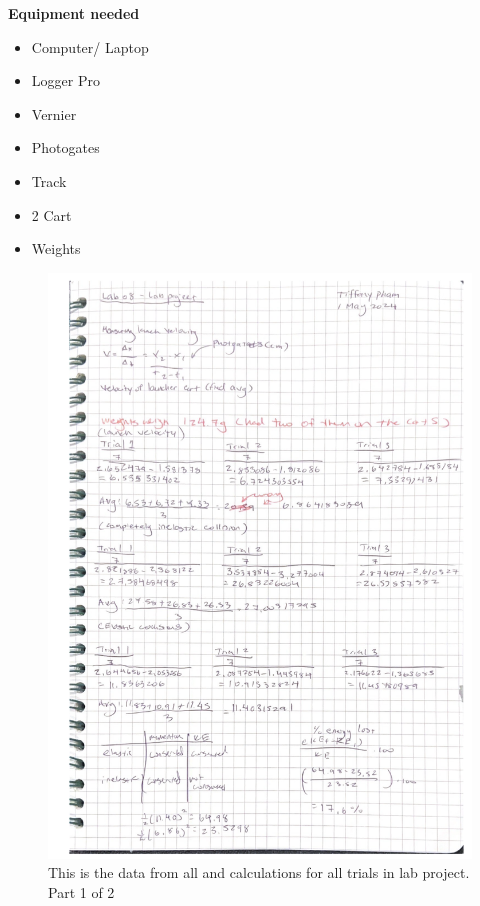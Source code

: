 \documentclass[idxtotoc,hyperref,openany]{labbook} %
\begin{document}
\hfill \break
\textbf{Equipment needed}
\begin{itemize}
    \item Computer/ Laptop
    \item Logger Pro
    \item Vernier
    \item Photogates
    \item Track
    \item 2 Cart
    \item Weights
\end{itemize}


\newpage
{}
\begin{figure}[H] %
\begin{center}
\includegraphics[width=0.8\linewidth]{images/Lab.08/Lab08Calc1.png}
\end{center}
\caption{This is the data from all and calculations for all trials in lab project. Part 1 of 2}
\label{fig:Lab08Calc1}
\end{figure}
\end{document}
